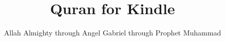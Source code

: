 \documentclass[a5paper]{book}
\title{Quran for Kindle}
\author{Allah Almighty through Angel Gabriel through Prophet Muhammad}
\date{}
\begin{document}
\frontmatter

{\let\cleardoublepage\clearpage 
\maketitle
\tableofcontents
}

\mainmatter


\end{document}
